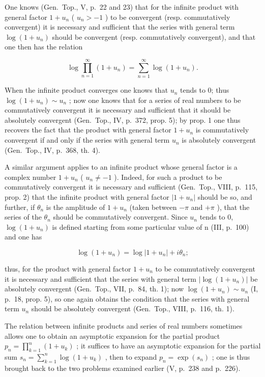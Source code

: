 One knows (Gen.~Top., V, p.~22 and 23) that for the infinite product with general factor \(1 + u_{n}\) ( \(u_{n} > -1\) ) to be convergent (resp. commutatively convergent) it is necessary and sufficient that the series with general term \(\log(1 + u_{n})\) should be convergent (resp. commutatively convergent), and that one then has the relation

\[
\log \prod_ {n = 1} ^ {\infty} (1 + u _ {n}) = \sum_ {n = 1} ^ {\infty} \log (1 + u _ {n}).
\]

When the infinite product converges one knows that \(u_{n}\) tends to 0; thus \(\log(1 + u_{n}) \sim u_{n}\) ; now one knows that for a series of real numbers to be commutatively convergent it is necessary and sufficient that it should be absolutely convergent (Gen.~Top., IV, p.~372, prop. 5); by prop. 1 one thus recovers the fact that the product with general factor \(1 + u_{n}\) is commutatively convergent if and only if the series with general term \(u_{n}\) is absolutely convergent (Gen.~Top., IV, p.~368, th. 4).

A similar argument applies to an infinite product whose general factor is a complex number \(1 + u_{n}\) ( \(u_{n} \neq -1\) ). Indeed, for such a product to be commutatively convergent it is necessary and sufficient (Gen.~Top., VIII, p.~115, prop. 2) that the infinite product with general factor \(|1 + u_{n}|\) should be so, and further, if \(\theta_{n}\) is the amplitude of \(1 + u_{n}\) (taken between \(-\pi\) and \(+\pi\) ), that the series of the \(\theta_{n}\) should be commutatively convergent. Since \(u_{n}\) tends to 0, \(\log(1 + u_{n})\) is defined starting from some particular value of n (III, p.~100) and one has

\[
\log (1 + u _ {n}) = \log | 1 + u _ {n} | + i \theta_ {n};
\]

thus, for the product with general factor \(1 + u_{n}\) to be commutatively convergent it is necessary and sufficient that the series with general term \(|\log(1 + u_{n})|\) be absolutely convergent (Gen.~Top., VII, p.~84, th. 1); now \(\log(1 + u_{n}) \sim u_{n}\) (I, p.~18, prop. 5), so one again obtains the condition that the series with general term \(u_{n}\) should be absolutely convergent (Gen.~Top., VIII, p.~116, th. 1).

The relation between infinite products and series of real numbers sometimes allows one to obtain an asymptotic expansion for the partial product \(p_{n} = \prod_{k=1}^{n}(1 + u_{k})\) ; it suffices to have an asymptotic expansion for the partial sum \(s_{n} = \sum_{k=1}^{n} \log(1 + u_{k})\) , then to expand \(p_{n} = \exp(s_{n})\) ; one is thus brought back to the two problems examined earlier (V, p.~238 and p.~226).

